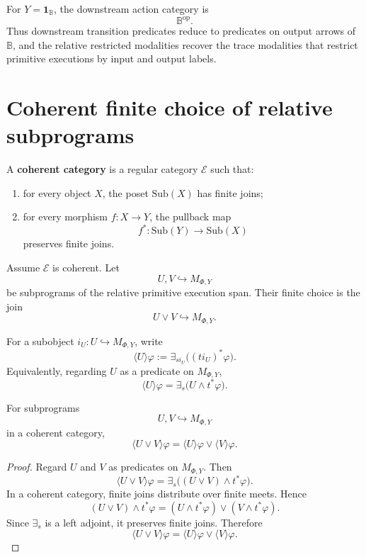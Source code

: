 \begin{corollary}
\label{cor:terminal-restricted-primitives}
For \(Y=\mathbf 1_{\mathbb B}\), the downstream action category is
\[
\mathbb B^{\mathrm{op}}.
\]
Thus downstream transition predicates reduce to predicates on output arrows
of \(\mathbb B\), and the relative restricted modalities recover the trace
modalities that restrict primitive executions by input and output labels.
\end{corollary}

\section{Coherent finite choice of relative subprograms}
\label{sec:coherent-choice-relative}

\begin{definition}
\label{def:coherent-category-relative}
A \textbf{coherent category} is a regular category \(\mathcal E\) such that:
\begin{enumerate}
\item for every object \(X\), the poset \(\mathrm{Sub}(X)\) has finite joins;
\item for every morphism \(f:X\to Y\), the pullback map
\[
f^\ast:\mathrm{Sub}(Y)\to\mathrm{Sub}(X)
\]
preserves finite joins.
\end{enumerate}
\end{definition}

Assume \(\mathcal E\) is coherent. Let
\[
U,V\hookrightarrow M_{\Phi,Y}
\]
be subprograms of the relative primitive execution span. Their finite choice
is the join
\[
U\vee V\hookrightarrow M_{\Phi,Y}.
\]

For a subobject \(i_U:U\hookrightarrow M_{\Phi,Y}\), write
\[
\langle U\rangle\varphi
:=
\exists_{s i_U}\bigl((t i_U)^\ast\varphi\bigr).
\]
Equivalently, regarding \(U\) as a predicate on \(M_{\Phi,Y}\),
\[
\langle U\rangle\varphi
=
\exists_s\bigl(U\wedge t^\ast\varphi\bigr).
\]

\begin{proposition}
\label{prop:relative-choice-law}
For subprograms
\[
U,V\hookrightarrow M_{\Phi,Y}
\]
in a coherent category,
\[
\langle U\vee V\rangle\varphi
=
\langle U\rangle\varphi
\vee
\langle V\rangle\varphi.
\]
\end{proposition}

\begin{proof}
Regard \(U\) and \(V\) as predicates on \(M_{\Phi,Y}\). Then
\[
\langle U\vee V\rangle\varphi
=
\exists_s\bigl((U\vee V)\wedge t^\ast\varphi\bigr).
\]
In a coherent category, finite joins distribute over finite meets. Hence
\[
(U\vee V)\wedge t^\ast\varphi
=
(U\wedge t^\ast\varphi)
\vee
(V\wedge t^\ast\varphi).
\]
Since \(\exists_s\) is a left adjoint, it preserves finite joins. Therefore
\[
\langle U\vee V\rangle\varphi
=
\langle U\rangle\varphi
\vee
\langle V\rangle\varphi.
\]
\end{proof}

